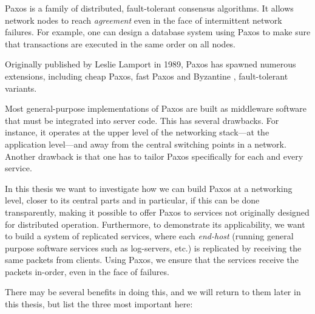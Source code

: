 Paxos is a
family of distributed, fault-tolerant consensus algorithms.  It allows
network nodes to reach \textit{agreement} even in the face of intermittent
network failures.  For example, one can design a database system using Paxos
to make sure that transactions are executed in the same order on all nodes.

Originally published by Leslie Lamport in 1989, Paxos
has spawned numerous extensions, including cheap Paxos,
 fast Paxos
 and Byzantine
, fault-tolerant variants.

Most general-purpose implementations of Paxos are built as middleware
software that must be integrated into server code.  This has several
drawbacks.  For instance, it operates at the upper level of the networking
stack---at the application level---and away from the central switching
points in a network.  Another drawback is that one has to tailor Paxos
specifically for each and every service.

In this thesis we want to investigate how we can build Paxos at a networking
level, closer to its central parts and in particular, if this can be done
transparently, making it possible to offer Paxos to services not originally
designed for distributed operation.
%
Furthermore, to demonstrate its applicability, we want to build a system of
replicated services, where each \textit{end-host} (running general purpose
software services such as log-servers, etc.) is replicated by receiving the
same packets from clients.
%
Using Paxos, we ensure that the services receive the packets in-order, even
in the face of failures.

There may be several benefits in doing this, and we will return to them
later in this thesis, but list the three most important here:

